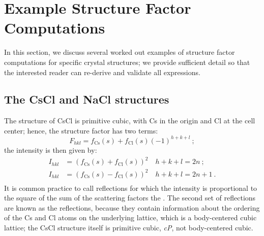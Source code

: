 \section{Example Structure Factor Computations}\label{\chabbr:sec:SFexamples}
In this section, we discuss several worked out examples of structure factor computations for specific crystal structures; we provide sufficient detail so that the interested reader can re-derive and validate all expressions. 

\subsection{The CsCl and NaCl structures}\label{\chabbr:ssec:SFCsNaCl}
The structure of CsCl is primitive cubic, with Cs in the origin and Cl at the cell center; hence, the structure factor has two terms:
\[
	F_{hkl} = f_{\text{Cs}}(s) + f_{\text{Cl}}(s)(-1)^{h+k+l}\ ;
\]
the intensity is then given by:
\begin{equation}
\begin{split}
	I_{hkl} &= (f_{\text{Cs}}(s) + f_{\text{Cl}}(s))^2\quad h+k+l=2n\ ;\\
	I_{hkl} &= (f_{\text{Cs}}(s) - f_{\text{Cl}}(s))^2\quad h+k+l=2n+1\ .\\	
\end{split}
\end{equation}
It is common practice to call reflections for which the intensity is proportional to the square of the sum of the scattering factors the .  The second set of reflections are known as the  reflections, because they contain information about the ordering of the Cs and Cl atoms on the underlying lattice, which is a body-centered cubic lattice; the CsCl structure itself is primitive cubic, \textit{cP}, not body-centered cubic.

